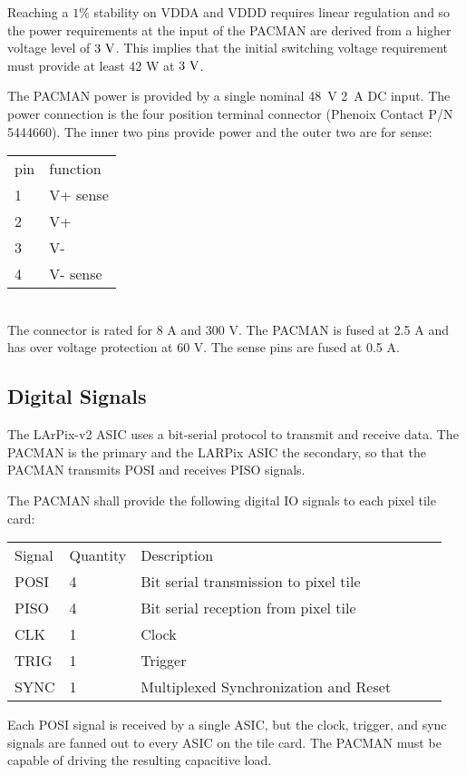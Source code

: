 \documentclass[12pt]{article}
\begin{document}
Reaching a $1\%$ stability on VDDA and VDDD requires linear regulation
and so the power requirements at the input of the PACMAN are derived
from a higher voltage level of $3~\rm V$.  This implies that the initial
switching voltage requirement must provide at least 42 W at $3~\rm V$.

The PACMAN power is provided by a single nominal 48~V 2~A DC input.
The power connection is the four position terminal connector (Phenoix
Contact P/N 5444660).  The inner two pins provide power and the outer
two are for sense:
\begin{tabular}{ll}
pin & function \\
1 & V+ sense  \\
2 & V+ \\
3 & V- \\
4 & V- sense \\ 
\end{tabular}\\
The connector is rated for 8 A and 300 V.  The PACMAN is fused at 2.5
A and has over voltage protection at 60 V.  The sense pins are fused
at 0.5 A.

\subsection{Digital Signals}

The LArPix-v2 ASIC uses a bit-serial protocol to transmit and receive
data.  The PACMAN is the primary and the LARPix ASIC the secondary, so
that the PACMAN transmits POSI and receives PISO signals.

The PACMAN shall provide the following digital IO signals to each
pixel tile card:
\begin{center}
\begin{tabular}{llllll}
Signal & Quantity & Description \\
  POSI & 4 & Bit serial transmission to pixel tile \\
  PISO & 4 & Bit serial reception from pixel tile \\
  CLK  & 1 & Clock \\
  TRIG & 1 & Trigger \\
  SYNC & 1 & Multiplexed Synchronization and Reset \\
\end{tabular}
\end{center}

Each POSI signal is received by a single ASIC, but the clock, trigger,
and sync signals are fanned out to every ASIC on the tile card.  The
PACMAN must be capable of driving the resulting capacitive load.
\end{document}
